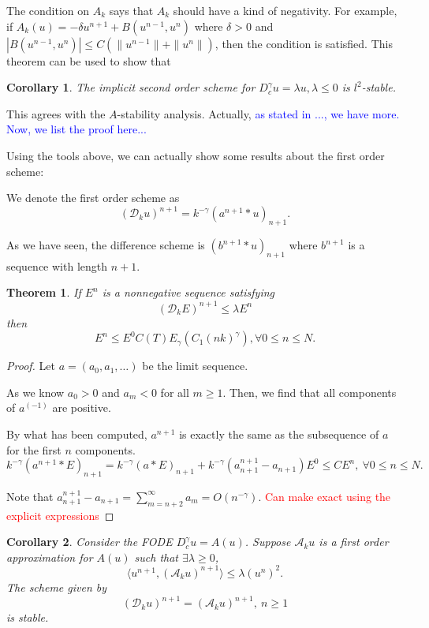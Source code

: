 \documentclass[11pt]{article} %
\newcommand{\tcb}[1]{\textcolor{blue}{#1}}
\newcommand{\tcr}[1]{\textcolor{red}{#1}}
\newtheorem{thm}{Theorem}
\newtheorem{cor}{Corollary}
\begin{document}
The condition on $A_k$ says that $A_k$ should have a kind of negativity. For example, if $A_k(u)=-\delta u^{n+1}+B(u^{n-1}, u^n)$ where $\delta>0$ and $|B(u^{n-1}, u^n)|\le C(\|u^{n-1}\|+\|u^n\|)$, then the condition is satisfied. This theorem can be used to show that 
\begin{cor}
The implicit second order scheme for $D_c^{\gamma}u=\lambda u, \lambda\le 0$ is $l^2$-stable.
\end{cor}
This agrees with the $A$-stability analysis.
Actually, \tcb{as stated in ..., we have more. Now, we list the proof here...} 


Using the tools above, we can actually show some results about the first order scheme:

We denote the first order scheme as $$
(\mathscr{D}_ku)^{n+1}=k^{-\gamma}(a^{n+1}*u)_{n+1}.
$$

As we have seen, the difference scheme is $(b^{n+1}*u)_{n+1}$ where $b^{n+1}$ is a sequence with length $n+1$. 

\begin{thm}
If $E^n$ is a nonnegative sequence satisfying $$
(\mathscr{D}_kE)^{n+1}\le \lambda E^n
$$
then $$
E^n\le E^0 C(T)E_{\gamma}(C_1(nk)^{\gamma}), \forall 0\le n\le N.
$$
\end{thm}

\begin{proof}
Let $a=(a_0, a_1,\ldots)$ be the limit sequence.

As we know $a_0>0$ and $a_m<0$ for all $m\ge 1$. Then, we find that all components of $a^{(-1)}$ are positive.

By what has been computed, $a^{n+1}$ is exactly the same as the subsequence of $a$ for the first $n$ components. $$
k^{-\gamma}(a^{n+1}*E)_{n+1}=k^{-\gamma}(a*E)_{n+1}+k^{-\gamma}(a_{n+1}^{n+1}-a_{n+1})E^0\le CE^{n},\ \forall 0\le n\le N.
$$

Note that $a_{n+1}^{n+1}-a_{n+1}=\sum_{m=n+2}^{\infty}a_m=O(n^{-\gamma})$. \tcr{Can make exact using the explicit expressions}
\end{proof}

\begin{cor}
Consider the FODE $D_c^{\gamma}u=A(u)$. Suppose $\mathscr{A}_ku$ is a first order approximation for $A(u)$ such that $\exists\lambda\ge 0$, $$
\langle u^{n+1}, (\mathscr{A}_ku)^{n+1}\rangle\le \lambda(u^{n})^2.
$$
The scheme given by
$$
(\mathcal{D}_ku)^{n+1}=(\mathscr{A}_ku)^{n+1}, \ n\ge 1
$$
is stable.
\end{cor}
\end{document}
